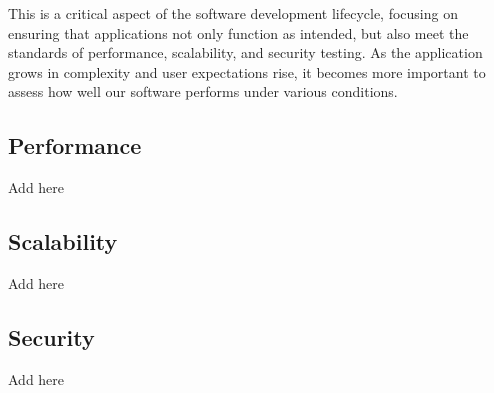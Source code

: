 \documentclass[a4paper,12pt]{article}
\begin{document}
This is a critical aspect of the software development lifecycle, focusing on ensuring that applications not only function as intended, but also meet the standards of performance, scalability, and security testing. As the application grows in complexity and user expectations rise, it becomes more important to assess how well our software performs under various conditions.

\subsection{Performance}

Add here

\subsection{Scalability}

Add here

\subsection{Security}

Add here
\end{document}
